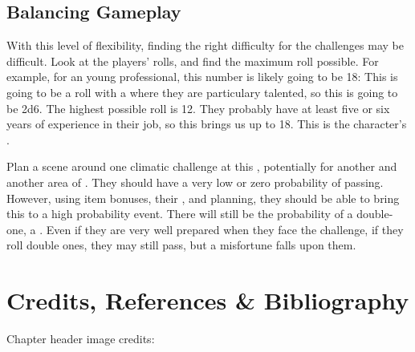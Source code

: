 \subsection*{Balancing Gameplay}

With this level of flexibility, finding the right difficulty for the challenges may be difficult. Look at the players' rolls, and find the maximum roll possible. For example, for an young professional,
this number is likely going to be 18: This is going to be a roll with a  where they are particulary talented, so this is going to be 2d6. The highest possible roll is 12. They probably have at least five or six years of experience in their job, so this brings us up to 18. This is the character's .

Plan a scene around one climatic challenge at this , potentially for another  and another area of . They should have a very low or zero probability of passing. However, using item bonuses, their , and planning, they should be able to bring this to a high probability event. There will still be the probability of a double-one, a . Even if they are very well prepared when they face the challenge, if they roll double ones, they may still pass, but a misfortune falls upon them.

\section*{Credits, References \& Bibliography}

Chapter header image credits: \cite{baby_faces}

\printbibliography[heading=none]
